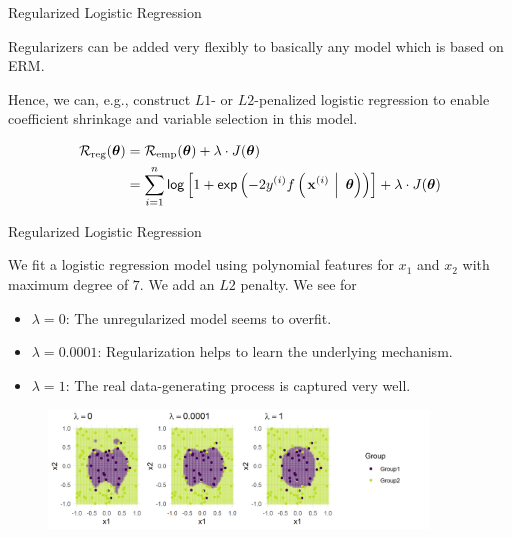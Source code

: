 \documentclass[11pt,compress,t,notes=noshow, xcolor=table]{beamer}
\begin{document}
\begin{vbframe}{Regularized Logistic Regression}

Regularizers can be added very flexibly to basically any model which is based on ERM.

\lz 

Hence, we can, e.g., construct $L1$- or $L2$-penalized logistic regression to enable coefficient shrinkage and variable selection in this model. 


\begin{align*}
\mathcal{R}_{\text{reg}}(\bm{\theta}) &= \mathcal{R}_{\text{emp}}(\bm{\theta}) + \lambda \cdot J(\bm{\theta}) \\
&= \sum\limits_{i=1}^n \mathsf{log}\left[1 + \mathsf{exp}\left(-2y^{(i)} f\left(\left.\mathbf{x}^{(i)}~\right|~ \bm{\theta}\right)\right)\right] + \lambda \cdot J(\bm{\theta})
\end{align*}


\end{vbframe}

\begin{vbframe}{Regularized Logistic Regression}


We fit a logistic regression model using polynomial features for \(x_1\)
and \(x_2\) with maximum degree of \(7\). We add an $L2$ penalty. We
see for

\begin{itemize}

\item
  \(\lambda = 0\): The unregularized model seems to overfit.
\item
  \(\lambda = 0.0001\): Regularization helps to learn the underlying
  mechanism.
\item
  \(\lambda = 1\): The real data-generating process is captured very well.
\end{itemize}

\scriptsize

\begin{figure}
\includegraphics[width=0.9\textwidth]{figure/reg_logreg.png}\\
\end{figure}


\normalsize 

\end{vbframe}


\endlecture
\end{document}
